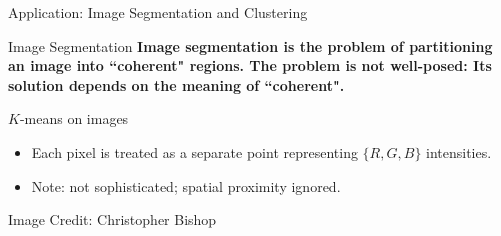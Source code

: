 \documentclass[10pt]{beamer}
\begin{document}
\begin{frame}{Application: Image Segmentation and Clustering}

\scriptsize 

\begin{sblock}{Image Segmentation}
 \bf{Image segmentation} is the problem of partitioning an image into ``coherent" regions.   The problem is not well-posed: Its solution depends on the meaning of ``coherent".
\end{sblock}

\begin{sblock}{$K$-means on images}
\begin{itemize}
\item Each pixel is treated as a separate point representing $\{R,G,B\}$ intensities.
\item Note: not sophisticated; spatial proximity ignored.
\end{itemize} 

\begin{center}
\end{center}
\hfill \tiny Image Credit: Christopher Bishop \scriptsize

\end{sblock}




\end{frame}
\end{document}
